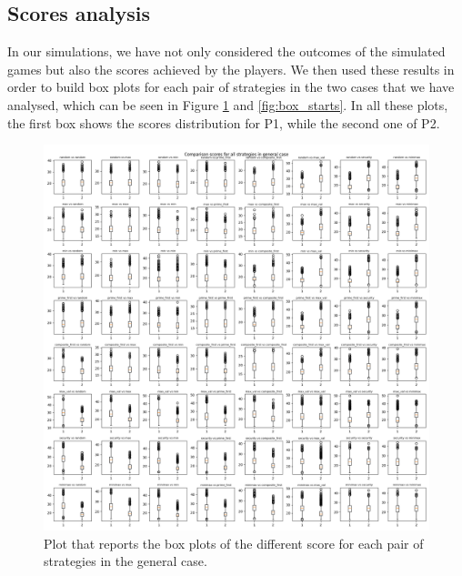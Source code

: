 \subsection{Scores analysis}

In our simulations, we have not only considered the outcomes of the simulated games but also the scores achieved by the players.
We then used these results in order to build box plots for each pair of strategies in the two cases that we have analysed, which can be seen in Figure \ref{fig:box_general} and \ref{fig:box_starts}. In all these plots, the first box shows the scores distribution for P1, while the second one of P2.

\begin{figure}
	\centering
	\includegraphics[width=1\linewidth]{img/scores_general.png}
	\caption{Plot that reports the box plots of the different score for each pair of strategies in the general case.}
	\label{fig:box_general}
\end{figure}

